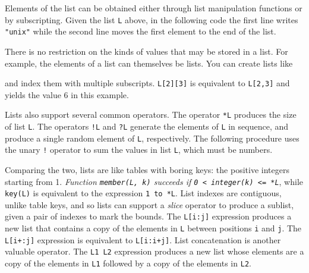 Elements of the list can be obtained either through list manipulation
functions or by subscripting. Given the list \texttt{L} above, in the
following code the first line writes
\texttt{"unix"} while the second line moves
the first element to the end of the list.


There is no restriction on the kinds of values that may be stored in a
list. For example, the elements of a list can themselves be lists. You
can create lists like


\noindent and index them with multiple subscripts. \texttt{L[2][3]} is
equivalent to \texttt{L[2,3]} and yields the value 6 in this example. 

Lists also support several common operators. The operator
\texttt{*L} produces the size of list \texttt{L}.
The operators \texttt{!L} and \texttt{?L} generate the elements of
\texttt{L} in sequence, and produce a single random element of
\texttt{L}, respectively. The following procedure uses the unary
\texttt{!} operator to sum the values in list \texttt{L}, which must be
numbers.


Comparing the two, lists are like tables with boring keys: the
positive integers starting from 1. {\em Function \texttt{member(L, k)}
succeeds if \texttt{0 {\textless} integer(k) {\textless}= *L}\/}, while
\texttt{key(L)} is equivalent to the expression \texttt{1 to *L}. List
indexes are contiguous, unlike table keys, and so lists can support a
\textit{slice} operator to produce a sublist,
given a pair of indexes to mark the bounds. The \texttt{L[i:j]}
expression produces a new list that contains a copy of the elements in
\texttt{L} between positions \texttt{i} and \texttt{j}. The
\texttt{L[i+:j]} expression is equivalent to \texttt{L[i:i+j]}. List
concatenation is another valuable operator. The \texttt{L1
{\textbar}{\textbar}{\textbar} L2} expression produces a new list whose
elements are a copy of the elements in \texttt{L1} followed by a copy
of the elements in \texttt{L2}.

